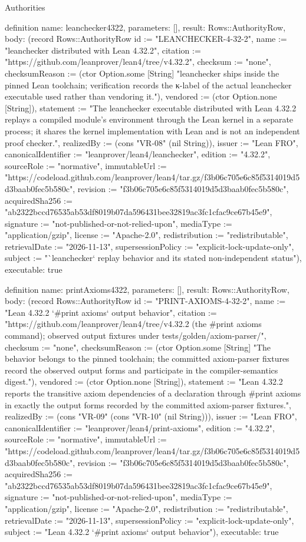 \begin{lexlean}{Authorities}
\begin{semanticmodule}
definition{
  name: leanchecker4322,
  parameters: [],
  result: Rows::AuthorityRow,
  body: (record Rows::AuthorityRow {id := "LEANCHECKER-4-32-2", name := "leanchecker distributed with Lean 4.32.2", citation := "https://github.com/leanprover/lean4/tree/v4.32.2", checksum := "none", checksumReason := (ctor Option.some [String] "leanchecker ships inside the pinned Lean toolchain; verification records the κ-label of the actual leanchecker executable used rather than vendoring it."), vendored := (ctor Option.none [String]), statement := "The leanchecker executable distributed with Lean 4.32.2 replays a compiled module's environment through the Lean kernel in a separate process; it shares the kernel implementation with Lean and is not an independent proof checker.", realizedBy := (cons "VR-08" (nil String)), issuer := "Lean FRO", canonicalIdentifier := "leanprover/lean4/leanchecker", edition := "4.32.2", sourceRole := "normative", immutableUrl := "https://codeload.github.com/leanprover/lean4/tar.gz/f3b06c705e6c85f5314019d5d3baab0fec5b580c", revision := "f3b06c705e6c85f5314019d5d3baab0fec5b580c", acquiredSha256 := "ab2322bccd76535ab53df8019b07da596431bee32819ac3fc1cfac9ce67b45e9", signature := "not-published-or-not-relied-upon", mediaType := "application/gzip", license := "Apache-2.0", redistribution := "redistributable", retrievalDate := "2026-11-13", supersessionPolicy := "explicit-lock-update-only", subject := "`leanchecker` replay behavior and its stated non-independent status"}),
  executable: true
}

definition{
  name: printAxioms4322,
  parameters: [],
  result: Rows::AuthorityRow,
  body: (record Rows::AuthorityRow {id := "PRINT-AXIOMS-4-32-2", name := "Lean 4.32.2 `#print axioms` output behavior", citation := "https://github.com/leanprover/lean4/tree/v4.32.2 (the #print axioms command); observed output fixtures under tests/golden/axiom-parser/", checksum := "none", checksumReason := (ctor Option.some [String] "The behavior belongs to the pinned toolchain; the committed axiom-parser fixtures record the observed output forms and participate in the compiler-semantics digest."), vendored := (ctor Option.none [String]), statement := "Lean 4.32.2 reports the transitive axiom dependencies of a declaration through #print axioms in exactly the output forms recorded by the committed axiom-parser fixtures.", realizedBy := (cons "VR-09" (cons "VR-10" (nil String))), issuer := "Lean FRO", canonicalIdentifier := "leanprover/lean4/print-axioms", edition := "4.32.2", sourceRole := "normative", immutableUrl := "https://codeload.github.com/leanprover/lean4/tar.gz/f3b06c705e6c85f5314019d5d3baab0fec5b580c", revision := "f3b06c705e6c85f5314019d5d3baab0fec5b580c", acquiredSha256 := "ab2322bccd76535ab53df8019b07da596431bee32819ac3fc1cfac9ce67b45e9", signature := "not-published-or-not-relied-upon", mediaType := "application/gzip", license := "Apache-2.0", redistribution := "redistributable", retrievalDate := "2026-11-13", supersessionPolicy := "explicit-lock-update-only", subject := "Lean 4.32.2 `#print axioms` output behavior"}),
  executable: true
}


\end{semanticmodule}
\end{lexlean}
